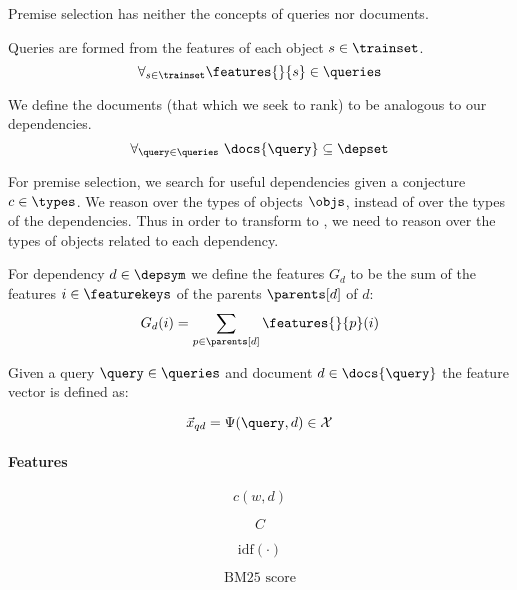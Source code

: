 Premise selection has neither the concepts of queries nor documents.

\begin{definition}
  Queries are formed from the features of each object $s \in \trainset$.
  \[
    \forall_{s \in \trainset} \features{}{s} \in \queries
  \]
\end{definition}

\begin{definition}
  We define the documents (that which we seek to rank) to be analogous to our dependencies.
  \[
    \forall_{\query \in \queries}~ \docs{\query} \subseteq \depset
  \]
\end{definition}

For premise selection, we search for useful dependencies given a conjecture $c \in \types$.
We reason over the types of objects $\objs$, instead of over the types of the dependencies.
Thus in order to transform to \ltr, we need to reason over the types of objects related to each dependency.

\begin{definition}
  For dependency $d \in \depsym$ we define the features $G_d$ to be the sum of
  the features $i \in \featurekeys$ of the parents $\parents[d]$ of $d$:
  \[
    G_d(i) = \sum_{p \in \parents[d]} \features{}{p}(i)
  \]
\end{definition}

\begin{definition}
  Given a query $\query \in \queries$ and document $d \in \docs{\query}$ the feature
  vector is defined as:

  \[
    {\vec{x}}_{q d} = \Psi(\query, d) \in \mathcal{X}
  \]
\end{definition}

\paragraph{Features}

\begin{definition}
  \[ c(w, d) \]
\end{definition}

\begin{definition}
  \[ C \]
\end{definition}

\begin{definition}
  \[ \text{idf}(\cdot) \]
\end{definition}

\begin{definition}
  \[ \text{BM25 score} \]
\end{definition}

